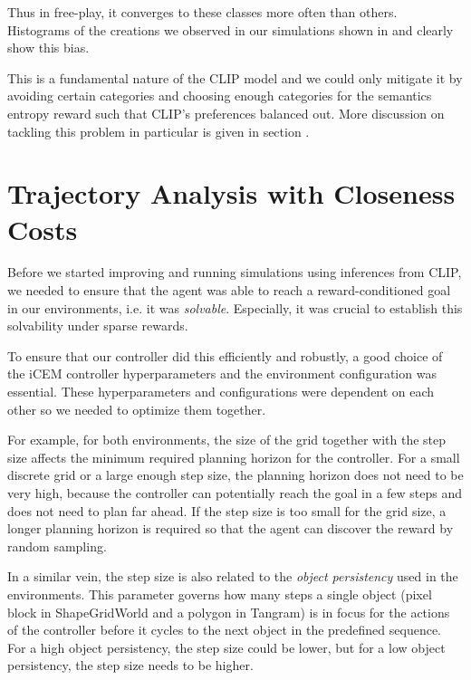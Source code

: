 Thus in free-play, it converges to these classes more often than others.
Histograms of the creations we observed in our simulations shown in  and  clearly show this bias.


This is a fundamental nature of the CLIP model and we could only mitigate it by avoiding certain categories and choosing enough categories for the semantics entropy reward such that CLIP's preferences balanced out.
More discussion on tackling this problem in particular is given in section .

\section{Trajectory Analysis with Closeness Costs}
\label{sec:closeness-rollouts}
Before we started improving and running simulations using inferences from CLIP, we needed to ensure that the agent was able to reach a reward-conditioned goal in our environments, i.e. it was \emph{solvable}.
Especially, it was crucial to establish this solvability under sparse rewards.

To ensure that our controller did this efficiently and robustly, a good choice of the iCEM controller hyperparameters and the environment configuration was essential.
These hyperparameters and configurations were dependent on each other so we needed to optimize them together.

For example, for both environments, the size of the grid together with the step size affects the minimum required planning horizon for the controller.
For a small discrete grid or a large enough step size, the planning horizon does not need to be very high, because the controller can potentially reach the goal in a few steps and does not need to plan far ahead.
If the step size is too small for the grid size, a longer planning horizon is required so that the agent can discover the reward by random sampling.

In a similar vein, the step size is also related to the \emph{object persistency} used in the environments.
This parameter governs how many steps a single object (pixel block in ShapeGridWorld and a polygon in Tangram) is in focus for the actions of the controller before it cycles to the next object in the predefined sequence.
For a high object persistency, the step size could be lower, but for a low object persistency, the step size needs to be higher.

